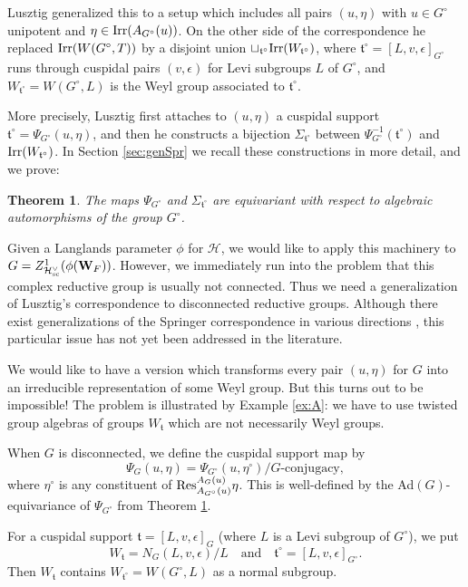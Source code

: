 \documentclass[11pt]{amsart}
\newtheorem{thmintro}{Theorem}
\theoremstyle{definition}
\newcommand{\mb}{\mathbf}
\def\Irr{{\rm Irr}}
\def\cH{{\mathcal H}}
\def\ft{{\mathfrak t}}
\def\Res{{\rm Res}}
\def\sc{{\rm sc}}
\begin{document}
Lusztig \cite{Lus1} generalized this to a setup which includes all pairs $(u,\eta)$
with $u \in G^\circ$ unipotent and $\eta \in \Irr (A_{G^\circ}(u))$. On the other 
side of the correspondence he replaced $\Irr (W (G^\circ,T))$ by a disjoint union 
$\sqcup_{\ft^\circ} \Irr (W_{\ft^\circ})$, where $\ft^\circ = [L,v,\epsilon]_{G^\circ}$ 
runs through cuspidal pairs $(v,\epsilon)$ for Levi subgroups $L$ of $G^\circ$, and 
$W_{\ft^\circ} = W(G^\circ,L)$ is the Weyl group associated to $\ft^\circ$.

More precisely, Lusztig first attaches to $(u,\eta)$ a cuspidal support $\ft^\circ =
\Psi_{G^\circ}(u,\eta)$, and then he constructs a bijection $\Sigma_{\ft^\circ}$ 
between $\Psi_{G^\circ}^{-1}(\ft^\circ)$ and $\Irr (W_{\ft^\circ})$. In Section 
\ref{sec:genSpr} we recall these constructions in more detail, and we prove:

\begin{thmintro}\label{thm:C}
The maps $\Psi_{G^\circ}$ and $\Sigma_{\ft^\circ}$ are equivariant with respect 
to algebraic automorphisms of the group $G^\circ$.
\end{thmintro}

Given a Langlands parameter $\phi$ for $\cH$, we would like to apply this machinery 
to $G = Z^1_{\cH^\vee_\sc}(\phi (\mb W_F))$. However, we immediately run into the 
problem that this complex reductive group is usually not connected. Thus we need 
a generalization of Lusztig's correspondence to disconnected reductive groups. 
Although there exist generalizations of the Springer correspondence in various
directions \cite{AcHe,AHJR,AcSa,Lus1,Lus4,LS,Sor}, this particular issue has not 
yet been addressed in the literature.

We would like to have a version which transforms every pair $(u,\eta)$ for $G$
into an irreducible representation of some Weyl group. But this
turns out to be impossible! The problem is illustrated by Example \ref{ex:A}:
we have to use twisted group algebras of groups $W_\ft$ which are not necessarily
Weyl groups.

When $G$ is disconnected, we define the cuspidal support map by
\[
\Psi_G (u,\eta) = \Psi_{G^\circ}(u,\eta^\circ) / G\text{-conjugacy} , 
\]
where $\eta^\circ$ is any constituent of $\Res_{A_{G^\circ}(u)}^{A_G (u)} \eta$.
This is well-defined by the Ad$(G)$-equivariance of $\Psi_{G^\circ}$ from 
Theorem \ref{thm:C}.

For a cuspidal support $\ft = [L,v,\epsilon]_G$ (where $L$ is a Levi subgroup of
$G^\circ$), we put 
\[
W_\ft = N_G (L,v,\epsilon) / L \quad \text{and} \quad 
\ft^\circ = [L,v,\epsilon]_{G^\circ}. 
\]
Then $W_\ft$ contains $W_{\ft^\circ} = W(G^\circ,L)$ as a normal subgroup.
\end{document}
